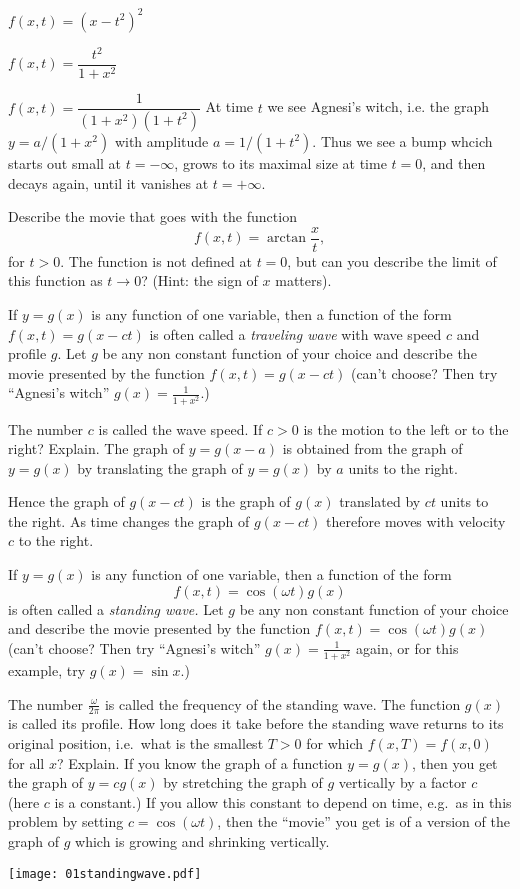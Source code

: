 \begin{multicols}{2}
\subprob $f(x, t) = (x-t^2)^2$

\subprob $f(x, t) = \dfrac{t^2}{1+x^2}$

\subprob $f(x, t) = \dfrac{1}{(1+x^2) (1+t^2)}$
\answer
At time $t$ we see Agnesi's witch, i.e. the graph $y= a/(1+x^2)$
with amplitude $a=1/(1+t^2)$.  Thus we see a bump whcich starts out small
 at $t=-\infty$, grows to its maximal size at time $t=0$, and then decays
again, until it vanishes at $t=+\infty$.
\endanswer

\problem Describe the movie that goes with the function
\[
  f(x, t) = \arctan \frac xt,
\]
for $t>0$.  The function is not defined at $t=0$, but can you describe the limit
of this function as $t\to0$?  (Hint: the sign of $x$ matters).


\problem \label{prb:01traveling-waves}
If $y=g(x)$ is any function of one variable, then a function of the
form $f(x, t) = g(x-ct)$ is often called a \emph{traveling wave} with
wave speed $c$ and profile $g$.  Let $g$ be any non constant
function of your choice and describe the movie presented by the
function $f(x, t) = g(x-ct)$ (can't choose?  Then try ``Agnesi's
witch'' $g(x) = \frac{1}{1+x^2}$.)

The number $c$ is called the wave speed.  If $c>0$ is the motion to
the left or to the right? Explain.
\answer
The graph of $y=g(x-a)$ is obtained from the graph of $y=g(x)$ by
translating the graph of $y=g(x)$ by $a$ units to the right.

Hence the graph of $g(x-ct)$ is the graph of $g(x)$ translated by $ct$
units to the right.  As time changes the graph of $g(x-ct)$ therefore
moves with velocity $c$ to the right.
\endanswer


\problem If $y=g(x)$ is any function of one variable, then a function 
of the form
\[
  f(x, t) = \cos(\omega t) g(x)
\]
is often called a \emph{standing wave.}
Let $g$ be any non constant function of your choice and describe the
movie presented by the function $f(x, t) = \cos(\omega t)g(x)$
(can't choose?  Then try ``Agnesi's witch''  $g(x) = \frac{1}{1+x^2}$
again, or for this example, try $g(x) = \sin x$.)

The number $\frac\omega{2\pi}$ is called the frequency of the standing
wave.  The function $g(x)$ is called its profile.  How long does it
take before the standing wave returns to its original position, i.e.\
what is the smallest $T>0$ for which $f(x, T) = f(x, 0)$ for all $x$?
Explain.
\answer
If you know the graph of a function $y=g(x)$, then you get
the graph of $y=cg(x)$ by stretching the graph of $g$ vertically by
a factor $c$ (here $c$ is a constant.)
If you allow this constant to depend on time, e.g.\ as in this
problem by setting $c=\cos(\omega t)$, then the ``movie'' you get is of a
version of the graph of $g$ which is growing and shrinking vertically.

\begin{center}
    \texttt{[image: 01standingwave.pdf]}
\end{center}
\endanswer
\end{multicols}
\noproblemfont


